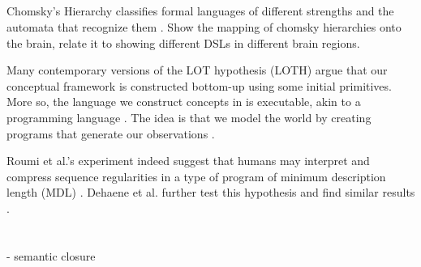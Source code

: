 \subsection{}
Chomsky's Hierarchy classifies formal languages of different strengths and the automata that recognize them \cite{chomsky1959certain}.
Show the mapping of chomsky hierarchies onto the brain, relate it to \cite{dehaene_symbols_2022} showing different DSLs in different brain regions.


Many contemporary versions of the LOT hypothesis (LOTH) argue that our conceptual framework is constructed bottom-up using some initial primitives. More so, the language we construct concepts in is executable, akin to a programming language \cite{dehaene_symbols_2022}. The idea is that we model the world by creating programs that generate our observations \cite{rule_child_2020}.

Roumi et al.'s experiment indeed suggest that humans may interpret and compress sequence regularities in a type of program of minimum description length (MDL) \cite{al_roumi_mental_2021}.
Dehaene et al. further test this hypothesis and find similar results \cite{dehaene_symbols_2022}.





\section{}
- semantic closure


